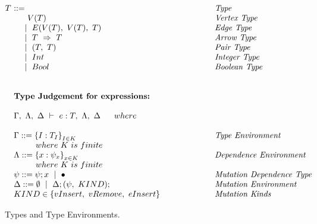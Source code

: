 \begin{figure}[h]
\begin{center}
$\begin{array}{@{}l@{~}l@{\quad}l@{\!\!\!\!\!\!}r}
T &  ::= & \hspace{20mm} \emph{Type} \\
&\ \ \ \   \ V(T) & \hspace{20mm} \emph{Vertex Type} \\
&\ \ \ \   \mid~E(V(T),~V(T),~T) & \hspace{20mm} \emph{Edge Type} \\
&\ \ \ \   \mid~T~\Rightarrow~T & \hspace{20mm} \emph{Arrow Type} \\
&\ \ \ \   \mid~(T,~T) & \hspace{20mm} \emph{Pair Type} \\
&\ \ \ \   \mid~Int  & \hspace{20mm} \emph{Integer Type} \\
&\ \ \ \   \mid~Bool  & \hspace{20mm} \emph{Boolean Type} \\
&\ \\
&\ \\
& \textbf{Type Judgement for expressions:}
&\ \\
&\ \\
& \Gamma,~\Lambda,~\Delta~\vdash~e : T,~\Lambda,~\Delta \ \ \ \ \  where \\ 
&\ \\
& \Gamma ::= {\{ I : T_I \}}_{I \in K} & \hspace{20mm} \emph{Type Environment} \\
& \ \ \ \ \ \ \ \ where~K~is~finite \\
& \Lambda ::= {\{ x: \psi_x \}}_{x \in K} & \hspace{20mm} \emph{Dependence Environment} \\
& \ \ \ \ \ \ \ \ where~K~is~finite \\
& \psi ::= \psi ;x~\mid~\bullet & \hspace{20mm} \emph{Mutation Dependence Type} \\
& \Delta ::= \emptyset~\mid~\Delta; (\psi,~KIND); & \hspace{20mm} \emph{Mutation Environment} \\
& KIND \in \{vInsert,~vRemove,~eInsert\} & \hspace{20mm} \emph{Mutation Kinds} \\
\end{array}
$

\end{center}
\caption{Types and Type Environments.}
\label{fig-type}
\end{figure}

